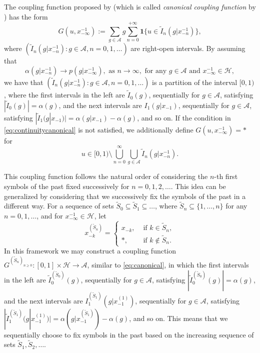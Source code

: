 \documentclass[a4paper]{article}
\renewcommand{\H}{\mathcal{H}}
\newcommand{\A}{\mathcal{A}}
\begin{document}
The coupling function proposed by \cite{cff} (which is called \textit{canonical coupling function} by \cite{desantispiccioni}) has the form
\begin{equation}\label{eq:canonical}
G(u,x_{-\infty}^{-1}):=\sum_{g\in \A}g\sum_{n=0}^{+\infty}\mathbf{1}\{u \in \tilde{I}_n(g|x_{-n}^{-1})\},
\end{equation}
where $(\tilde{I}_n(g|x_{-n}^{-1}):g\in \A, n=0,1,\ldots)$ are right-open intervals. By assuming that 
\begin{equation}\label{eq:continuitycanonical}
\alpha(g|x_{-n}^{-1})\to p(g|x_{-\infty}^{-1}), \text{ as } n \to \infty, \text{ for any } g\in \A \text{ and } x_{-\infty}^{-1}\in \H,
\end{equation}
we have that $(\tilde{I}_n(g|x_{-n}^{-1}):g\in \A, n=0,1,\ldots)$ is a partition of the interval $[0,1)$, where the first intervals in the left are $\tilde{I}_0(g)$, sequentially for $g\in \A$, satisfying $|\tilde{I}_0(g)|=\alpha(g)$, and the next intervals are $I_1(g|x_{-1})$, sequentially for $g\in \A$, satisfying $|\tilde{I}_1(g|x_{-1})|=\alpha(g|x_{-1})-\alpha(g)$, and so on. If the condition in \eqref{eq:continuitycanonical} is not satisfied, we additionally define $G(u,x_{-\infty}^{-1})=*$ for
$$
u\in [0,1)\setminus\bigcup_{n=0}^{\infty}\bigcup_{g\in \A}\tilde{I}_n(g|x_{-n}^{-1}).
$$

This coupling function follows the natural order of considering the $n$-th first symbols of the past fixed successively for $n=0,1,2,\ldots$. This idea can be generalized by considering that we successively fix the symbols of the past in a different way. For a sequence of sets $\tilde{S}_0 \subseteq \tilde{S}_1 \subseteq \ldots$, where $\tilde{S}_n \subseteq \{1,\ldots, n\}$ for any $n=0,1,\ldots$, and for $x_{-\infty}^{-1}\in \H$, let
$$
x_{-k}^{(\tilde{S}_n)} =
\begin{cases}
x_{-k}, &\text{ if } k \in \tilde{S}_n, \\
*, &\text{ if } k \not\in \tilde{S}_n.
\end{cases}
$$
In this framework we may construct a coupling function $G^{(\tilde{S}_n)_{n\geq 0}}:[0,1]\times \H \to \A$, similar to \eqref{eq:canonical}, in which the first intervals in the left are $\tilde{I}^{(\tilde{S}_0)}_0(g)$, sequentially for $g\in \A$, satisfying $|\tilde{I}_0^{(\tilde{S}_0)}(g)|=\alpha(g)$, and the next intervals are $I_1^{(\tilde{S}_1)}(g|x_{-1}^{(1)})$, sequentially for $g\in \A$, satisfying $|\tilde{I}_1^{(\tilde{S}_1)}(g|x_{-1}^{(1)})|=\alpha(g|x_{-1}^{(\tilde{S}_1)})-\alpha(g)$, and so on. This means that we sequentially choose to fix symbols in the past based on the increasing sequence of sets $\tilde{S}_1, \tilde{S}_2, \ldots$.
\end{document}
